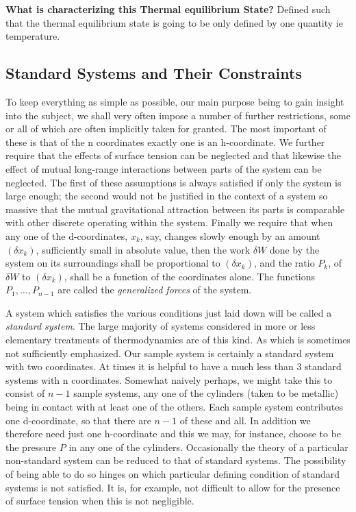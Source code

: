 \documentclass{article}
\theoremstyle{definition}
\begin{document}
\textbf{What is characterizing this Thermal equilibrium State?}
Defined such that the thermal equilibrium state is going to be only defined by one quantity ie temperature.


\subsection{Standard Systems and Their Constraints}
To keep everything as simple as possible, our main purpose being to gain insight into the subject, we shall very often impose a number of further restrictions, some or all of which are often implicitly taken for granted. The most important of these is that of the n coordinates exactly one is an h-coordinate. We further require that the effects of surface tension can be neglected and that likewise the effect of mutual long-range interactions between parts of the system can be neglected. The first of these assumptions is always satisfied if only the system is large enough; the second would not be justified in the context of a system so massive that the mutual gravitational attraction between its parts is comparable with other discrete operating within the system. Finally we require that when any one of the d-coordinates, \(x_k\), say, changes slowly enough by an amount $(\delta x_k)$, sufficiently small in absolute value, then the work $\delta W$ done by the system on its surroundings shall be proportional to $(\delta x_k)$, and the ratio \(P_k\), of $\delta W$ to $(\delta x_k)$, shall be a function of the coordinates alone. The functions \(P_1, \ldots, P_{n-1}\) are called the \textit{generalized forces} of the system.

A system which satisfies the various conditions just laid down will be called a \textit{standard system}. The large majority of systems considered in more or less elementary treatments of thermodynamics are of this kind. As which is sometimes not sufficiently emphasized. Our sample system is certainly a standard system with two coordinates. At times it is helpful to have a much less than 3 standard systems with n coordinates. Somewhat naively perhaps, we might take this to consist of \(n - 1\) sample systems, any one of the cylinders (taken to be metallic) being in contact with at least one of the others. Each sample system contributes one d-coordinate, so that there are \(n - 1\) of these and all. In addition we therefore need just one h-coordinate and this we may, for instance, choose to be the pressure \(P\) in any one of the cylinders. Occasionally the theory of a particular non-standard system can be reduced to that of standard systems. The possibility of being able to do so hinges on which particular defining condition of standard systems is not satisfied. It is, for example, not difficult to allow for the presence of surface tension when this is not negligible.
\end{document}
